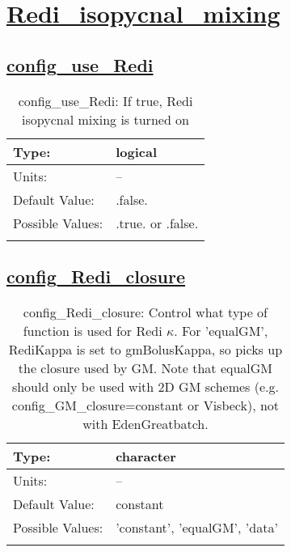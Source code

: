 \section[Redi\_isopycnal\_mixing]{\hyperref[sec:nm_tab_Redi_isopycnal_mixing]{Redi\_isopycnal\_mixing}}
\label{sec:nm_sec_Redi_isopycnal_mixing}
\subsection[config\_use\_Redi]{\hyperref[sec:nm_tab_Redi_isopycnal_mixing]{config\_use\_Redi}}
\label{subsec:nm_sec_config_use_Redi}
\begin{center}
\begin{longtable}{| p{2.0in} || p{4.0in} |}
    \hline
    Type: & logical \\
    \hline
    Units: & -- \\
    \hline
    Default Value: & .false. \\
    \hline
    Possible Values: & .true. or .false. \\
    \hline
    \caption{config\_use\_Redi: If true, Redi isopycnal mixing is turned on}
\end{longtable}
\end{center}
\subsection[config\_Redi\_closure]{\hyperref[sec:nm_tab_Redi_isopycnal_mixing]{config\_Redi\_closure}}
\label{subsec:nm_sec_config_Redi_closure}
\begin{center}
\begin{longtable}{| p{2.0in} || p{4.0in} |}
    \hline
    Type: & character \\
    \hline
    Units: & -- \\
    \hline
    Default Value: & constant \\
    \hline
    Possible Values: & 'constant', 'equalGM', 'data' \\
    \hline
    \caption{config\_Redi\_closure: Control what type of function is used for Redi $\kappa$. For 'equalGM', RediKappa is set to gmBolusKappa, so picks up the closure used by GM. Note that equalGM should only be used with 2D GM schemes (e.g. config\_GM\_closure=constant or Visbeck), not with EdenGreatbatch.}
\end{longtable}
\end{center}

